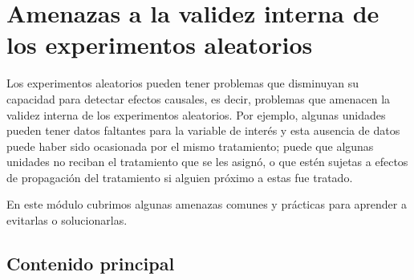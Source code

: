 \documentclass[12pt,spanish,]{book}
\begin{document}
\hypertarget{amenazas-a-la-validez-interna-de-los-experimentos-aleatorios}{%
\chapter{Amenazas a la validez interna de los experimentos aleatorios}\label{amenazas-a-la-validez-interna-de-los-experimentos-aleatorios}}

Los experimentos aleatorios pueden tener problemas que disminuyan su capacidad para detectar efectos causales, es decir, problemas que amenacen la validez interna de los experimentos aleatorios. Por ejemplo, algunas unidades pueden tener datos faltantes para la variable de interés y esta ausencia de datos puede haber sido ocasionada por el mismo tratamiento; puede que algunas unidades no reciban el tratamiento que se les asignó, o que estén sujetas a efectos de propagación del tratamiento si alguien próximo a estas fue tratado.

En este módulo cubrimos algunas amenazas comunes y prácticas para aprender a evitarlas o solucionarlas.

\hypertarget{contenido-principal-7}{%
\section{Contenido principal}\label{contenido-principal-7}}
\end{document}
